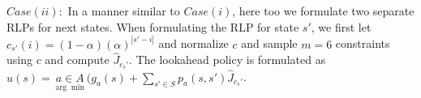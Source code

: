 $Case (ii):$ In a manner similar to $Case (i)$, here too we formulate two separate RLPs for next states. When formulating the RLP for state $s'$, we first let $c_{s'}(i)=(1-\alpha)(\alpha)^{|s'-i|}$ and normalize $c$ and sample $m=6$ constraints using $c$ and compute $\hat{J}_{c_s'}$. The lookahead policy is formulated as $u(s)=\underset{\arg\min}{a\in A}(g_a(s)+\underset{s'\in S}{\sum}p_a(s,s')\hat{J}_{c_s'}$.

